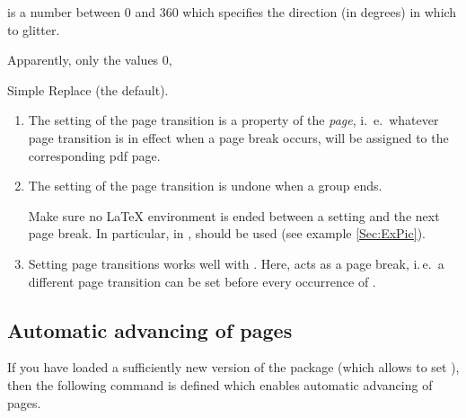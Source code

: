 \begin{slide}
\begin{description}
    \stepwise
    {%
       is a number between $0$ and $360$ which specifies the direction (in degrees) in which to glitter.

      Apparently, only the values $0$,
      }%
    \pause

  \item[{\present[h]{\macroname{pageTransitionReplace}}}]
    Simple Replace (the default).
  \end{description}

  \pageTransitionReplace

  \newslide

  \begin{enumerate}
  \item The setting of the page transition is a property of the \emph{page}, i.~e.\ whatever page transition is in
    effect when a page break occurs, will be assigned to the corresponding pdf page.

  \item The setting of the page transition is undone when a group ends.

    Make sure no \LaTeX{} environment is ended between a  setting and the next page break. In
    particular, in ,  should be used (see example \ref{Sec:ExPic}).

  \newslide

  \item Setting page transitions works well with . Here,  acts as a page break,
    i.\,e.\ a different page transition can be set before every occurrence of .
  \end{enumerate}

  \newslide

  \subsection{Automatic advancing of pages}\label{Sec:PageDuration}
  If you have loaded a sufficiently new version of the
  \href{ftp://ftp.dante.de/tex-archive/help/Catalogue/entries/hyperref.html}{} package (which allows to
  set ), then the following command is defined which enables automatic advancing of 
  pages.


\end{slide}
